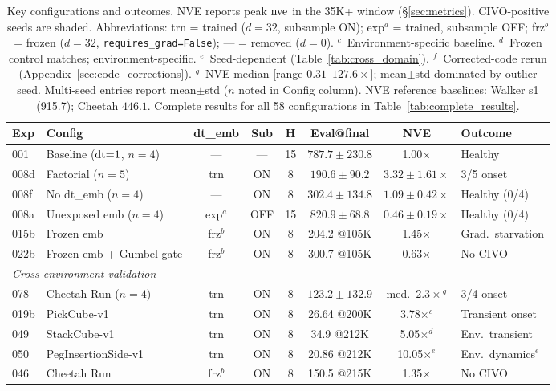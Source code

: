 \begin{table}[t]
\centering
\caption{Key configurations and outcomes. NVE reports peak $\mathrm{nve}$ in the 35K+ window (\S\ref{sec:metrics}). CIVO-positive seeds are shaded. Abbreviations: trn = trained ($d{=}32$, subsample ON); exp$^a$ = trained, subsample OFF; frz$^b$ = frozen ($d{=}32$, \texttt{requires\_grad=False}); --- = removed ($d{=}0$). $^c$~Environment-specific baseline. $^d$~Frozen control matches; environment-specific. $^e$~Seed-dependent (Table~\ref{tab:cross_domain}). $^f$~Corrected-code rerun (Appendix~\ref{sec:code_corrections}). $^g$~NVE median [range $0.31$--$127.6\times$]; mean$\pm$std dominated by outlier seed. Multi-seed entries report mean$\pm$std ($n$ noted in Config column). NVE reference baselines: Walker s1 (915.7); Cheetah $446.1$. Complete results for all 58 configurations in Table~\ref{tab:complete_results}.}
\label{tab:main_results}
\footnotesize
\setlength{\tabcolsep}{4pt}
\begin{tabular}{llcccccl}
\toprule
\textbf{Exp} & \textbf{Config} & \textbf{dt\_emb} & \textbf{Sub} & \textbf{H} & \textbf{Eval@final} & \textbf{NVE} & \textbf{Outcome} \\
\midrule
001 & Baseline ($\mathrm{dt}{=}1$, $n{=}4$) & --- & --- & 15 & $787.7 \pm 230.8$ & 1.00$\times$ & Healthy \\
\midrule
\rowcolor{gray!15}
008d & Factorial ($n{=}5$) & trn & ON & 8 & $190.6 \pm 90.2$ & $3.32 \pm 1.61\times$ & 3/5 onset \\
008f & No dt\_emb ($n{=}4$) & --- & ON & 8 & $302.4 \pm 134.8$ & $1.09 \pm 0.42\times$ & Healthy (0/4) \\
008a & Unexposed emb ($n{=}4$) & exp$^a$ & OFF & 15 & $820.9 \pm 68.8$ & $0.46 \pm 0.19\times$ & Healthy (0/4) \\
015b & Frozen emb & frz$^b$ & ON & 8 & 204.2 @105K & 1.45$\times$ & Grad.\ starvation \\
022b & Frozen emb + Gumbel gate & frz$^b$ & ON & 8 & 300.7 @105K & 0.63$\times$ & No CIVO \\
\midrule
\multicolumn{8}{l}{\textit{Cross-environment validation}} \\
\rowcolor{gray!15}
078 & Cheetah Run ($n{=}4$) & trn & ON & 8 & $123.2 \pm 132.9$ & med.\ $2.3\times$$^g$ & 3/4 onset \\
019b & PickCube-v1 & trn & ON & 8 & 26.64 @200K & 3.78$\times$$^c$ & Transient onset \\
049 & StackCube-v1 & trn & ON & 8 & 34.9 @212K & 5.05$\times$$^d$ & Env.\ transient \\
050 & PegInsertionSide-v1 & trn & ON & 8 & 20.86 @212K & 10.05$\times$$^e$ & Env.\ dynamics$^e$ \\
046 & Cheetah Run & frz$^b$ & ON & 8 & 150.5 @215K & 1.35$\times$ & No CIVO \\
\bottomrule
\end{tabular}
\end{table}

